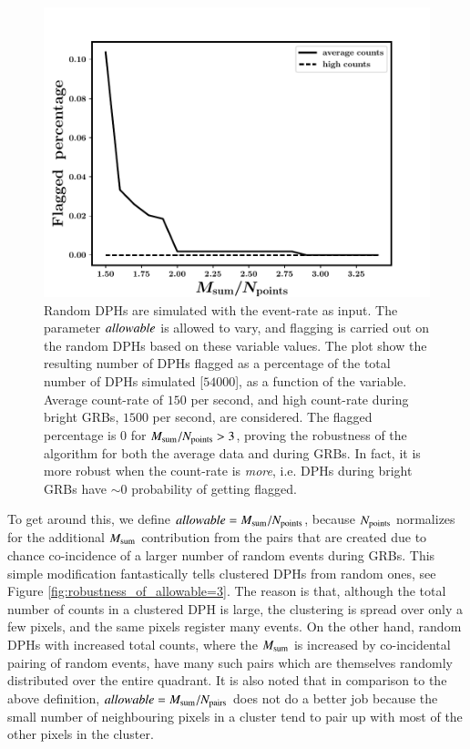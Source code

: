 \begin{figure}
\begin{center}
\includegraphics[scale=0.45]{DPH_simulations--flagged_percentage--zoom}
\end{center}
\caption[False alarm probability and the robustness of the algorithm]{Random DPHs are simulated with the event-rate as input. The parameter $allowable$ is allowed to vary, and flagging is carried out on the random DPHs based on these variable values. The plot show the resulting number of DPHs flagged as a percentage of the total number of DPHs simulated [$54000$], as a function of the variable. Average count-rate of $150$ per second, and high count-rate during bright GRBs, $1500$ per second, are considered. The flagged percentage is $0$ for $ M_{\rm{sum}} / N_{\rm{points}} > 3 $, proving the robustness of the algorithm for both the average data and during GRBs. In fact, it is more robust when the count-rate is \emph{more}, i.e. DPHs during bright GRBs have $\sim 0$ probability of getting flagged.
\label{fig:robustness_with_countrate}}
\end{figure}


To get around this, we define $allowable = M_{\rm{sum}} / N_{\rm{points}} $, because $N_{\rm{points}}$ normalizes for the additional $M_{\rm{sum}}$ contribution from the pairs that are created due to chance co-incidence of a larger number of random events during GRBs. This simple modification fantastically tells clustered DPHs from random ones, see Figure \ref{fig:robustness_of_allowable=3}. The reason is that, although the total number of counts in a clustered DPH is large, the clustering is spread over only a few pixels, and the same pixels register many events. On the other hand, random DPHs with increased total counts, where the $M_{\rm{sum}}$ is increased by co-incidental pairing of random events, have many such pairs which are themselves randomly distributed over the entire quadrant. It is also noted that in comparison to the above definition, $allowable = M_{\rm{sum}} / N_{\rm{pairs}}$ does not do a better job because the small number of neighbouring pixels in a cluster tend to pair up with most of the other pixels in the cluster.

